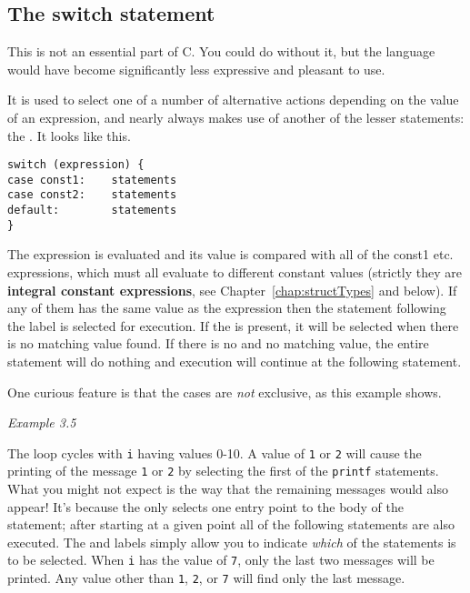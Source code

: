   

  \subsection{The switch statement}
   

   This is not an essential part of C. You could do without it, but
    the language would have become significantly less expressive and pleasant
    to use.


   It is used to select one of a number of alternative actions depending on
    the value of an expression, and nearly always makes use of another of the
    lesser statements: the \kbreak. It looks like this.


   \begin{Verbatim}
switch (expression) {
case const1:    statements
case const2:    statements
default:        statements
}
\end{Verbatim}

   The expression is evaluated and its value is compared with
    all of the const1 etc. expressions, which must all evaluate
    to different constant values (strictly they are \textbf{integral constant
      expressions}, see Chapter~\ref{chap:structTypes} and below).
    If any of them
    has the same value as the expression then the statement
    following the \case{} label is selected for execution. If the
     is present, it will be selected when there is no
    matching value found. If there is no  and no matching
    value, the entire \switch{} statement will do nothing and
    execution will continue at the following statement.


   One curious feature is that the cases are \textit{not} exclusive, as
    this example shows.


    \begin{center}\textit{Example 3.5}\end{center}


   The loop cycles with \texttt{i} having values 0-10. A value of
    \texttt{1} or \texttt{2} will cause the printing of the message
    \texttt{1} or \texttt{2} by selecting the first of the
    \texttt{printf} statements. What you might not expect is the way that
    the remaining messages would also appear! It's because the
    \switch{} only selects one entry point to the body of the
    statement; after starting at a given point all of the following statements
    are also executed. The \case{} and  labels
    simply allow you to indicate \textit{which} of the statements is to be
    selected. When \texttt{i} has the value of \texttt{7}, only the
    last two messages will be printed. Any value other than \texttt{1},
    \texttt{2}, or \texttt{7} will find only the last message.


